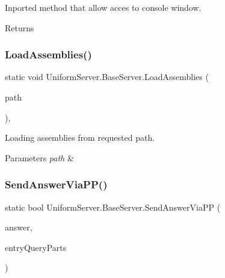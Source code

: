 Inported method that allow acces to console window. 

\begin{DoxyReturn}{Returns}

\end{DoxyReturn}
\mbox{\label{class_uniform_server_1_1_base_server_a22b92ad517cd1003fe4fe3c86d857169}} 
\subsubsection{\texorpdfstring{Load\+Assemblies()}{LoadAssemblies()}}
{\footnotesize\ttfamily static void Uniform\+Server.\+Base\+Server.\+Load\+Assemblies (\begin{DoxyParamCaption}\item[{string}]{path }\end{DoxyParamCaption})\hspace{0.3cm}{\ttfamily [static]}, {\ttfamily [protected]}}



Loading assemblies from requested path. 


\begin{DoxyParams}{Parameters}
{\em path} & \\
\hline
\end{DoxyParams}
\mbox{\label{class_uniform_server_1_1_base_server_aefbb2a4287a7f995582b2abf41da8a89}} 
\subsubsection{\texorpdfstring{Send\+Answer\+Via\+P\+P()}{SendAnswerViaPP()}}
{\footnotesize\ttfamily static bool Uniform\+Server.\+Base\+Server.\+Send\+Answer\+Via\+PP (\begin{DoxyParamCaption}\item[{string}]{answer,  }\item[{\mbox{\hyperlink{struct_uniform_queries_1_1_query_part}{Uniform\+Queries.\+Query\+Part}} \mbox{[}$\,$\mbox{]}}]{entry\+Query\+Parts }\end{DoxyParamCaption})\hspace{0.3cm}{\ttfamily [static]}}



